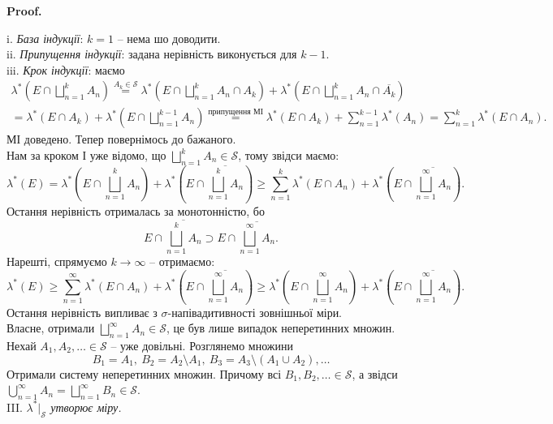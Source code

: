 \documentclass[a4paper, 10pt]{article}
\makeatletter
\theoremstyle{theoremdd}
\renewenvironment{proof}[1][Proof.\\]{\par
\pushQED{\hfill \qed}%
\normalfont \topsep6\p@\@plus6\p@\relax
\trivlist
\item\relax
{\bfseries
#1\@addpunct{.}}\hspace\labelsep\ignorespaces
}{%
\popQED\endtrivlist\@endpefalse
}
\makeatother
\begin{document}
\begin{proof}
\[\]
i. \textit{База індукції}: $k = 1$ -- нема шо доводити.\\
ii. \textit{Припущення індукції}: задана нерівність виконується для $k-1$.\\
iii. \textit{Крок індукції}: маємо 
\begin{align*}
\displaystyle\lambda^*\left( E \cap \bigsqcup_{n=1}^k A_n \right) \overset{A_k \in \mathcal{S}}{=} \lambda^*\left( E \cap \bigsqcup_{n=1}^k A_n \cap A_k \right) + \lambda^*\left( E \cap \bigsqcup_{n=1}^k A_n \cap \overline{A_k}\right) \\
= \lambda^*(E \cap A_k) + \lambda^*\left( E \cap \bigsqcup_{n=1}^{k-1} A_n \right) \overset{\text{припущення МІ}}{=} \lambda^*(E \cap A_k) + \sum_{n=1}^{k-1} \lambda^*(A_n) = \sum_{n=1}^k \lambda^*(E \cap A_n).
\end{align*}
МІ доведено. Тепер повернімось до бажаного.\\
Нам за кроком І уже відомо, що $\displaystyle\bigsqcup_{n=1}^k A_n \in \mathcal{S}$, тому звідси маємо:
\begin{equation}
\label{eq:inequality_in_Caratheodory}
\lambda^*(E) = \lambda^*\left(E \cap \bigsqcup_{n=1}^k A_n \right) + \lambda^*\left( E \cap \overline{\bigsqcup_{n=1}^k A_n} \right) \geq \sum_{n=1}^k \lambda^*(E \cap A_n) + \lambda^*\left( E \cap \overline{\bigsqcup_{n=1}^\infty A_n} \right).
\end{equation}
Остання нерівність отрималась за монотонністю, бо 
\[
E \cap \overline{\bigsqcup_{n=1}^k A_n} \supset E \cap \overline{\bigsqcup_{n=1}^\infty A_n}.
\] 
Нарешті, спрямуємо $k \to \infty$ -- отримаємо:
\[
\displaystyle\lambda^*(E) \geq \sum_{n=1}^\infty \lambda^*(E \cap A_n) + \lambda^*\left( E \cap \overline{\bigsqcup_{n=1}^\infty A_n} \right) \geq \lambda^*\left( E \cap \bigsqcup_{n=1}^\infty A_n \right) + \lambda^*\left( E \cap \overline{\bigsqcup_{n=1}^\infty A_n} \right).
\]
Остання нерівність випливає з $\sigma$-напівадитивності зовнішньої міри.\\
Власне, отримали $\displaystyle\bigsqcup_{n=1}^\infty A_n \in \mathcal{S}$, це був лише випадок неперетинних множин.\\
Нехай $A_1,A_2,\dots \in \mathcal{S}$ -- уже довільні. Розглянемо множини 
\[
B_1 = A_1,\ B_2 = A_2 \setminus A_1,\ B_3 = A_3 \setminus (A_1 \cup A_2), \dots
\] 
Отримали систему неперетинних множин. Причому всі $B_1,B_2,\dots \in \mathcal{S}$, а звідси $\displaystyle \bigcup_{n=1}^\infty A_n = \bigsqcup_{n=1}^\infty B_n \in \mathcal{S}$.
\bigskip \\
III. \textit{$\lambda^*|_{\mathcal{S}}$ утворює міру.}\\

\end{proof}
\end{document}
